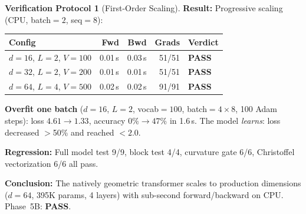 \documentclass[11pt,a4paper]{article}
\theoremstyle{definition}
\newtheorem{protocol}[theorem]{Verification Protocol}
\theoremstyle{remark}
\begin{document}
\begin{protocol}[First-Order Scaling]
\textbf{Result:} Progressive scaling (CPU, batch$=2$, seq$=8$):
\begin{center}
\begin{tabular}{lrrrl}
\toprule
Config & Fwd & Bwd & Grads & Verdict \\
\midrule
$d=16$, $L=2$, $V=100$   & 0.01\,s & 0.03\,s & 51/51 & \textbf{PASS} \\
$d=32$, $L=2$, $V=200$   & 0.01\,s & 0.01\,s & 51/51 & \textbf{PASS} \\
$d=64$, $L=4$, $V=500$   & 0.02\,s & 0.02\,s & 91/91 & \textbf{PASS} \\
\bottomrule
\end{tabular}
\end{center}

\textbf{Overfit one batch} ($d=16$, $L=2$, vocab$=100$, 
batch$=4 \times 8$, 100 Adam steps):
loss $4.61 \to 1.33$, accuracy $0\% \to 47\%$ in 1.6\,s. 
The model \emph{learns}: loss decreased $>$50\% and reached 
$<2.0$.

\textbf{Regression:} Full model test 9/9, block test 4/4, 
curvature gate 6/6, Christoffel vectorization 6/6 all pass.

\textbf{Conclusion:} The natively geometric transformer scales 
to production dimensions ($d=64$, 395K params, 4 layers) with 
sub-second forward/backward on CPU. Phase~5B: \textbf{PASS}.
\end{protocol}
\end{document}
